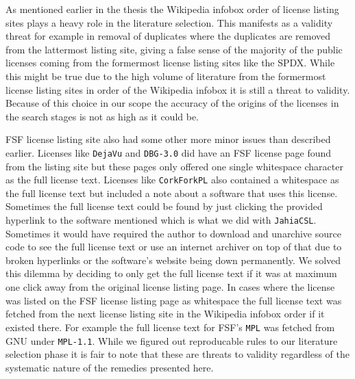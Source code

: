 As mentioned earlier in the thesis the Wikipedia infobox order of license listing sites plays a heavy role in the literature selection. This manifests as a validity threat for example in removal of duplicates where the duplicates are removed from the lattermost listing site, giving a false sense of the majority of the public licenses coming from the formermost license listing sites like the SPDX. While this might be true due to the high volume of literature from the formermost license listing sites in order of the Wikipedia infobox it is still a threat to validity. Because of this choice in our scope the accuracy of the origins of the licenses in the search stages is not as high as it could be.

FSF license listing site also had some other more minor issues than described earlier. Licenses like \texttt{DejaVu} and \texttt{DBG-3.0} did have an FSF license page found from the listing site but these pages only offered one single whitespace character as the full license text. Licenses like \texttt{CorkForkPL} also contained a whitespace as the full license text but included a note about a software that uses this license. Sometimes the full license text could be found by just clicking the provided hyperlink to the software mentioned which is what we did with \texttt{JahiaCSL}. Sometimes it would have required the author to download and unarchive source code to see the full license text or use an internet archiver on top of that due to broken hyperlinks or the software's website being down permanently. We solved this dilemma by deciding to only get the full license text if it was at maximum one click away from the original license listing page. In cases where the license was listed on the FSF license listing page as whitespace the full license text was fetched from the next license listing site in the Wikipedia infobox order if it existed there. For example the full license text for FSF's \texttt{MPL} was fetched from GNU under \texttt{MPL-1.1}. While we figured out reproducable rules to our literature selection phase it is fair to note that these are threats to validity regardless of the systematic nature of the remedies presented here.

